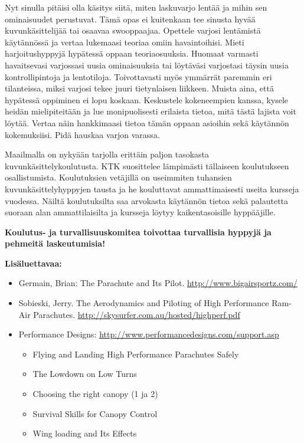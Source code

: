
Nyt sinulla pitäisi olla käsitys siitä, miten laskuvarjo lentää ja mihin sen ominaisuudet perustuvat. Tämä opas ei kuitenkaan tee sinusta hyvää kuvunkäsittelijää tai osaavaa swooppaajaa. Opettele varjosi lentämistä käytännössä ja vertaa lukemaasi teoriaa omiin havaintoihisi. Mieti harjoitushyppyjä hypätessä oppaan teoriaosuuksia. Huomaat varmasti havaitsevasi varjossasi uusia ominaisuuksia tai löytäväsi varjostasi täysin uusia kontrollipintoja ja lentotiloja. Toivottavasti myös ymmärrät paremmin eri tilanteissa, miksi varjosi tekee juuri tietynlaisen liikkeen. Muista aina, että hypätessä oppiminen ei lopu koskaan. Keskustele kokeneempien kanssa, kysele heidän mielipiteitään ja lue monipuolisesti erilaista tietoa, mitä tästä lajista voit löytää. Vertaa näin hankkimaasi tietoa tämän oppaan asioihin sekä käytännön kokemuksiisi. Pidä hauskaa varjon varassa. 


Maailmalla on nykyään tarjolla erittäin paljon tasokasta kuvunkäsittelykoulutusta. KTK suosittelee lämpimästi tällaiseen koulutukseen osallistumista. Koulutuksien vetäjillä on useimmiten tuhansien kuvunkäsittelyhyppyjen tausta ja he kouluttavat ammattimaisesti useita kursseja vuodessa. Näiltä koulutuksilta saa arvokasta käytännön tietoa sekä palautetta suoraan alan ammattilaisilta ja kursseja löytyy kaikentasoisille hyppääjille. 


\textbf{Koulutus- ja turvallisuuskomitea toivottaa turvallisia hyppyjä ja pehmeitä laskeutumisia!} 


\textbf{Lisäluettavaa:} 
\raggedright
\begin{itemize}
\item  Germain, Brian: The Parachute and Its Pilot. \url{http://www.bigairsportz.com/} 
\item  Sobieski, Jerry. The Aerodynamics and Piloting of High Performance Ram-Air Parachutes. \url{http://skysurfer.com.au/hosted/highperf.pdf} 
\item  Performance Designs: \url{http://www.performancedesigns.com/support.asp} 
	\begin{itemize}
	\item  Flying and Landing High Performance Parachutes Safely 
	\item  The Lowdown on Low Turns 
	\item  Choosing the right canopy (1 ja 2) 
	\item  Survival Skills for Canopy Control 
	\item  Wing loading and Its Effects 
	\end{itemize}
\end{itemize}

